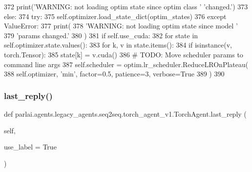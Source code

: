 \begin{DoxyCode}
372                 print(\textcolor{stringliteral}{'WARNING: not loading optim state since optim class '} \textcolor{stringliteral}{'changed.'})
373             \textcolor{keywordflow}{else}:
374                 \textcolor{keywordflow}{try}:
375                     self.optimizer.load\_state\_dict(optim\_states)
376                 \textcolor{keywordflow}{except} ValueError:
377                     print(
378                         \textcolor{stringliteral}{'WARNING: not loading optim state since model '}
379                         \textcolor{stringliteral}{'params changed.'}
380                     )
381                 \textcolor{keywordflow}{if} self.use\_cuda:
382                     \textcolor{keywordflow}{for} state \textcolor{keywordflow}{in} self.optimizer.state.values():
383                         \textcolor{keywordflow}{for} k, v \textcolor{keywordflow}{in} state.items():
384                             \textcolor{keywordflow}{if} isinstance(v, torch.Tensor):
385                                 state[k] = v.cuda()
386         \textcolor{comment}{# TODO: Move scheduler params to command line args}
387         self.scheduler = optim.lr\_scheduler.ReduceLROnPlateau(
388             self.optimizer, \textcolor{stringliteral}{'min'}, factor=0.5, patience=3, verbose=\textcolor{keyword}{True}
389         )
390 
\end{DoxyCode}
\mbox{\label{classparlai_1_1agents_1_1legacy__agents_1_1seq2seq_1_1torch__agent__v1_1_1TorchAgent_abf7a50ea0eb319737123d2e46fde4c0f}} 
\subsubsection{\texorpdfstring{last\+\_\+reply()}{last\_reply()}}
{\footnotesize\ttfamily def parlai.\+agents.\+legacy\+\_\+agents.\+seq2seq.\+torch\+\_\+agent\+\_\+v1.\+Torch\+Agent.\+last\+\_\+reply (\begin{DoxyParamCaption}\item[{}]{self,  }\item[{}]{use\+\_\+label = {\ttfamily True} }\end{DoxyParamCaption})}


